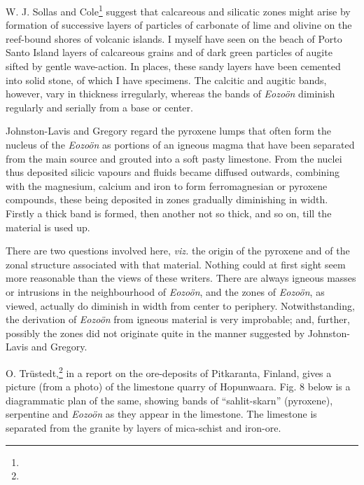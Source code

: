 \documentclass[a4paper, 12pt, oneside]{article}
\begin{document}
W. J. Sollas and Cole\footnote{} suggest that calcareous and silicatic zones might arise by formation of successive layers of particles of carbonate of lime and olivine on the reef-bound shores of volcanic islands. I myself have seen on the beach of Porto Santo Island layers of calcareous grains and of dark green particles of augite sifted by gentle wave-action. In places, these sandy layers have been cemented into solid stone, of which I have specimens. The calcitic and augitic bands, however, vary in thickness irregularly, whereas the bands of \emph{Eozoön} diminish regularly and serially from a base or center.

Johnston-Lavis and Gregory regard the pyroxene lumps that often form the nucleus of the \emph{Eozoön} as portions of an igneous magma that have been separated from the main source and grouted into a soft pasty limestone. From the nuclei thus deposited silicic vapours and fluids became diffused outwards, combining with the magnesium, calcium and iron to form ferromagnesian or pyroxene compounds, these being deposited in zones gradually diminishing in width. Firstly a thick band is formed, then another not so thick, and so on, till the material is used up.

There are two questions involved here, \emph{viz.} the origin of the pyroxene and of the zonal structure associated with that material. Nothing could at first sight seem more reasonable than the views of these writers. There are always igneous masses or intrusions in the neighbourhood of \emph{Eozoön}, and the zones of \emph{Eozoön}, as viewed, actually do diminish in width from center to periphery. Notwithstanding, the derivation of \emph{Eozoön} from igneous material is very improbable; and, further, possibly the zones did not originate quite in the manner suggested by Johnston-Lavis and Gregory.

O. Trüstedt,\footnote{} in a report on the ore-deposits of Pitkaranta, Finland, gives a picture (from a photo) of the limestone quarry of Hopunwaara. Fig. 8 below is a diagrammatic plan of the same, showing bands of ``sahlit-skarn'' (pyroxene), serpentine and \emph{Eozoön} as they appear in the limestone. The limestone is separated from the granite by layers of mica-schist and iron-ore. 
\end{document}
